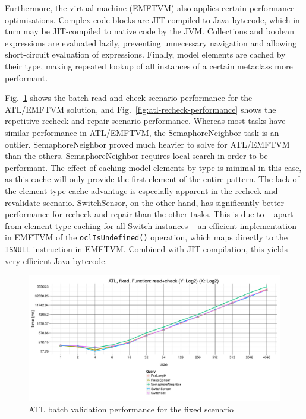 \documentclass[submission,copyright,creativecommons]{eptcs}
\begin{document}
Furthermore, the virtual machine (EMFTVM) also applies certain performance optimisations. Complex code blocks are JIT-compiled to Java bytecode, which in turn may be JIT-compiled to native code by the JVM. Collections and boolean expressions are evaluated lazily, preventing unnecessary navigation and allowing short-circuit evaluation of expressions. Finally, model elements are cached by their type, making repeated lookup of all instances of a certain metaclass more performant.

Fig.~\ref{fig:atl-batch-performance} shows the batch read and check scenario performance for the ATL/EMFTVM solution, and Fig.~\ref{fig:atl-recheck-performance} shows the repetitive recheck and repair scenario performance. Whereas most tasks have similar performance in ATL/EMFTVM, the SemaphoreNeighbor task is an outlier. SemaphoreNeighbor proved much heavier to solve for ATL/EMFTVM than the others. SemaphoreNeighbor requires local search in order to be performant. The effect of caching model elements by type is minimal in this case, as this cache will only provide the first element of the entire pattern. The lack of the element type cache advantage is especially apparent in the recheck and revalidate scenario. SwitchSensor, on the other hand, has significantly better performance for recheck and repair than the other tasks. This is due to -- apart from element type caching for all Switch instances -- an efficient implementation in EMFTVM of the \texttt{oclIsUndefined()} operation, which maps directly to the \texttt{ISNULL} instruction in EMFTVM. Combined with JIT compilation, this yields very efficient Java bytecode.

\begin{figure}[ht]
\centerline{
\includegraphics[width=15cm]{figures/fixed-ATL-GroupBy-Query-time-batch-validation}}
\caption{ATL batch validation performance for the fixed scenario}
\label{fig:atl-batch-performance}
\end{figure}
\end{document}
